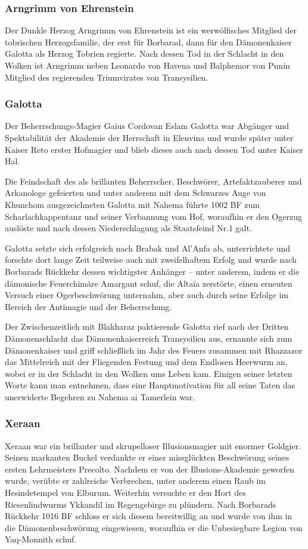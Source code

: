 \subsubsection{Arngrimm von Ehrenstein}
Der Dunkle Herzog Arngrimm von Ehrenstein ist ein werwölfisches Mitglied der tobrischen Herzogsfamilie, der erst für Borbarad, dann für den Dämonenkaiser Galotta als Herzog Tobrien regierte. Nach dessen Tod in der Schlacht in den Wolken ist Arngrimm neben Leonardo von Havena und Balphemor von Punin Mitglied des regierenden Triumvirates von Transysilien. 

\subsubsection{Galotta}
Der Beherrschungs-Magier Gaius Cordovan Eslam Galotta war Abgänger und Spektabilität der Akademie der Herrschaft in Elenvina und wurde später unter Kaiser Reto erster Hofmagier und blieb dieses auch nach dessen Tod unter Kaiser Hal.

Die Feindschaft des als brillanten Beherrscher, Beschwörer, Artefaktzauberer und Arkanologe gefeierten und unter anderem mit dem Schwarzes Auge von Khunchom ausgezeichneten Galotta mit Nahema führte 1002 BF zum Scharlachkappentanz und seiner Verbannung vom Hof, woraufhin er den Ogerzug auslöste und nach dessen Niederschlagung als Staatsfeind Nr.1 galt.

Galotta setzte sich erfolgreich nach Brabak und Al'Anfa ab, unterrichtete und forschte dort lange Zeit teilweise auch mit zweifelhaftem Erfolg und wurde nach Borbarads Rückkehr dessen wichtigster Anhänger – unter anderem, indem er die dämonische Feuerchimäre Amargant schuf, die Altaïa zerstörte, einen erneuten Versuch einer Ogerbeschwörung unternahm, aber auch durch seine Erfolge im Bereich der Antimagie und der Beherrschung.

Der Zwischenzeitlich mit Blakharaz paktierende Galotta rief nach der Dritten Dämonenschlacht das Dämonenkaiserreich Transysilien aus, ernannte sich zum Dämonenkaiser und griff schließlich im Jahr des Feuers zusammen mit Rhazzazor das Mittelreich mit der Fliegenden Festung und dem Endlosen Heerwurm an, wobei er in der Schlacht in den Wolken ums Leben kam. Einigen seiner letzten Worte kann man entnehmen, dass eine Hauptmotivation für all seine Taten das unerwiderte Begehren zu Nahema ai Tamerlein war. 

\subsubsection{Xeraan}
Xeraan war ein brillanter und skrupelloser Illusionsmagier mit enormer Goldgier. Seinen markanten Buckel verdankte er einer missglückten Beschwörung seines ersten Lehrmeisters Precolto.
Nachdem er von der Illusions-Akademie geworfen wurde, verübte er zahlreiche Verbrechen, unter anderem einen Raub im Hesindetempel von Elburum. Weiterhin versuchte er den Hort des Riesenlindwurms Ykkandil im Regengebirge zu plündern. Nach Borbarads Rückkehr 1016 BF schloss er sich diesem bereitwillig an und wurde von ihm in die Dämonenbeschwörung eingewiesen, woraufhin er die Unbesiegbare Legion von Yaq-Monnith schuf.

